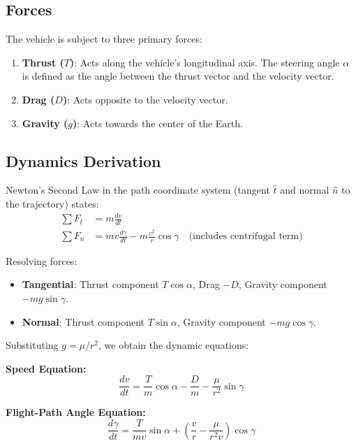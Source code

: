 \documentclass[11pt]{article}
\begin{document}
\subsection{Forces}
The vehicle is subject to three primary forces:
\begin{enumerate}
    \item \textbf{Thrust ($T$)}: Acts along the vehicle's longitudinal axis. The steering angle $\alpha$ is defined as the angle between the thrust vector and the velocity vector.
    \item \textbf{Drag ($D$)}: Acts opposite to the velocity vector.
    \item \textbf{Gravity ($g$)}: Acts towards the center of the Earth.
\end{enumerate}

\subsection{Dynamics Derivation}
Newton's Second Law in the path coordinate system (tangent $\hat{t}$ and normal $\hat{n}$ to the trajectory) states:
\begin{align}
    \sum F_t &= m \frac{dv}{dt} \\
    \sum F_n &= m v \frac{d\gamma}{dt} - m \frac{v^2}{r} \cos\gamma \quad \text{(includes centrifugal term)}
\end{align}

Resolving forces:
\begin{itemize}
    \item \textbf{Tangential}: Thrust component $T \cos\alpha$, Drag $-D$, Gravity component $-mg \sin\gamma$.
    \item \textbf{Normal}: Thrust component $T \sin\alpha$, Gravity component $-mg \cos\gamma$.
\end{itemize}

Substituting $g = \mu / r^2$, we obtain the dynamic equations:

\textbf{Speed Equation:}
\begin{equation}
    \label{eq:dv}
    \frac{dv}{dt} = \frac{T}{m} \cos\alpha - \frac{D}{m} - \frac{\mu}{r^2} \sin\gamma
\end{equation}

\textbf{Flight-Path Angle Equation:}
\begin{equation}
    \label{eq:dgamma}
    \frac{d\gamma}{dt} = \frac{T}{m v} \sin\alpha + \left( \frac{v}{r} - \frac{\mu}{r^2 v} \right) \cos\gamma
\end{equation}
\end{document}
